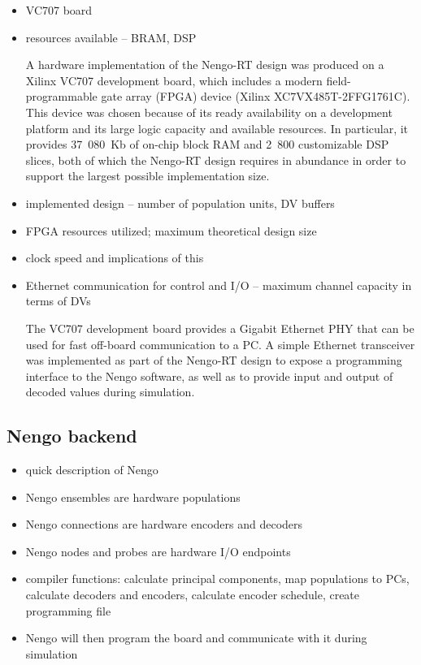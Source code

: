\documentclass[english]{article}
\begin{document}
\begin{itemize}
\item VC707 board
\item resources available -- BRAM, DSP

A hardware implementation of the Nengo-RT design was produced on a Xilinx VC707 development board, which includes a modern field-programmable gate array (FPGA)
device (Xilinx XC7VX485T-2FFG1761C). This device was chosen because of its ready availability on a development platform and its large logic capacity and available resources.
In particular, it provides 37~080~Kb of on-chip block RAM and 2~800 customizable DSP slices, both of which the Nengo-RT design requires in abundance in order to support
the largest possible implementation size. 

\item implemented design -- number of population units, DV buffers

\item FPGA resources utilized; maximum theoretical design size
\item clock speed and implications of this
\item Ethernet communication for control and I/O -- maximum channel capacity in terms of DVs

The VC707 development board provides a Gigabit Ethernet PHY that can be used for fast off-board communication to a PC.
A simple Ethernet transceiver was implemented as part of the Nengo-RT design to expose a programming interface to the Nengo software,
as well as to provide input and output of decoded values during simulation.

\end{itemize}

\subsection{Nengo backend}

\begin{itemize}
\item quick description of Nengo
\item Nengo ensembles are hardware populations
\item Nengo connections are hardware encoders and decoders
\item Nengo nodes and probes are hardware I/O endpoints
\item compiler functions: calculate principal components, map populations to PCs, calculate decoders and encoders,
calculate encoder schedule, create programming file
\item Nengo will then program the board and communicate with it during simulation
\end{itemize}
\end{document}
